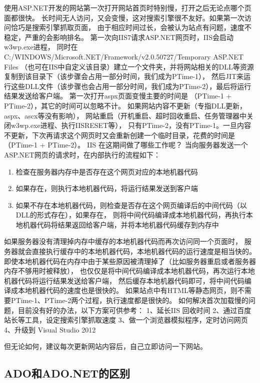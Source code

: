 \documentclass{book}
\begin{document}
使用ASP.NET开发的网站第一次打开网站首页时特别慢，打开之后无论点哪个页面都很快。
长时间无人访问，又会变慢，这对搜索引擎很不友好。如果第一次访问恰巧是搜索引擎抓取页面，
由于相应时间过长，会被认为站点有问题，速度不稳定，严重的会影响排名。
第一次向IIS7请求ASP.NET网页时，IIS会启动w3wp.exe进程，
同时在C:/WINDOWS/Microsoft.NET/Framework/v2.0.50727/Temporary ASP.NET Files （也可在IIS中自定义该目录）建立一个文件夹，并将网站相关的DLL等资源复制到该目录下（该步骤会占用一部分时间，我们成为PTime-1），
然后JIT来运行这些DLL文件（该步骤也会占用一部分时间，我们成为PTime-2），最后将运行结果发送给客户端。
第一次打开aspx页面变慢主要的时间是 （PTime-1 + PTime-2），其它的时间可以忽略不计。
如果网站内容不更新（专指DLL更新，aspx、ascx等没有影响），
网站重启（开机重启、超时回收重启、任务管理器中关闭w3wp.exe进程、执行IISRESET等），
只有PTime-2，没有PTime-1。一旦内容不更新，下次再请求这个网页时又会重新创建一个临时目录，花费的时间是 （PTime-1 + PTime-2）。
IIS 在这期间做了哪些工作呢？ 当向服务器发送一个ASP.NET网页的请求时，在内部执行的流程如下：

\begin{enumerate}
\setcounter{enumi}{0}
\item{检查在服务器内存中是否存在这个网页对应的本地机器代码}
\item{如果存在，则执行本地机器代码，将运行结果发送到客户端}
\item{如果不存在本地机器代码，则检查是否存在这个网页编译后的中间代码（以DLL的形式存在），如果存在，
则将中间代码编译成本地机器代码，再执行本地机器代码将结果返回给客户端，并将本地机器代码缓存到内存中}
\end{enumerate}

如果服务器没有清理掉内存中缓存的本地机器代码而再次访问同一个页面时，
服务器就会直接执行缓存中的本地机器代码，本地机器代码的运行速度是相当快的。
即使本地机器代码在内存中由于某些原因被清理掉了（比如服务器重启或者服务器内存不够用时被释放），
也仅仅是将中间代码编译成本地机器代码，再次运行本地机器代码将运行结果发送给客户端，
然后缓存本地机器代码即可，将中间代码编译成本地机器代码的速度也是很快的。
如果站点中有HTML等静态网页，则不需要PTime-1、PTime-2两个过程，执行速度都是很快的。
如何解决首次加载慢的问题，目前没有好的办法，以下方案可供参考：
1、延长IIS 回收时间
2、通过百度站长等工具，设定搜索引擎抓取速度
3、做一个浏览器模拟程序，定时访问网页
4、升级到 Visual Studio 2012

但无论如何，建议每次更新网站内容后，自己立即访问一下网站。

\subsection{ADO和ADO.NET的区别}
\end{document}

